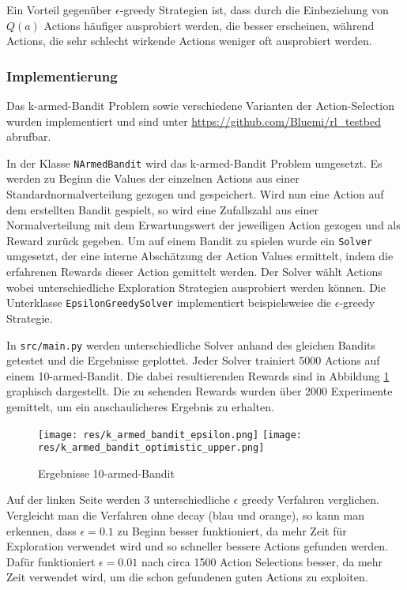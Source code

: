 \documentclass[11pt]{scrartcl}
\begin{document}
Ein Vorteil gegenüber $\epsilon$-greedy Strategien ist, dass durch die Einbeziehung von
$Q(a)$ Actions häufiger ausprobiert werden, die besser erscheinen, während Actions, die
sehr schlecht wirkende Actions weniger oft ausprobiert werden.


\subsubsection{Implementierung}
Das k-armed-Bandit Problem sowie verschiedene Varianten der Action-Selection wurden
implementiert und sind unter \url{https://github.com/Bluemi/rl_testbed} abrufbar.

In der Klasse \lstinline!NArmedBandit! wird das k-armed-Bandit Problem umgesetzt. Es
werden zu Beginn die Values der einzelnen Actions aus einer Standardnormalverteilung
gezogen und gespeichert. Wird nun eine Action auf dem erstellten Bandit gespielt, so wird
eine Zufallszahl aus einer Normalverteilung mit dem Erwartungswert der jeweiligen Action
gezogen und als Reward zurück gegeben.
Um auf einem Bandit zu spielen wurde ein \lstinline!Solver! umgesetzt, der eine interne
Abschät\-zung der Action Values ermittelt, indem die erfahrenen Rewards dieser Action
gemittelt werden. Der Solver wählt Actions wobei unterschiedliche Exploration Strategien
ausprobiert werden können. Die Unterklasse \lstinline!EpsilonGreedySolver! implementiert
beispielsweise die $\epsilon$-greedy Strategie.

In \lstinline!src/main.py! werden unterschiedliche Solver anhand des gleichen Bandits
getestet und die Ergebnisse geplottet. Jeder Solver trainiert 5000 Actions auf einem
10-armed-Bandit. Die dabei resultierenden Rewards sind in Abbildung
\ref{fig:karmed_bandit} graphisch dargestellt. Die zu sehenden Rewards wurden über 2000
Experimente gemittelt, um ein anschaulicheres Ergebnis zu erhalten.

\begin{figure}[htp]
\centering
\texttt{[image: res/k\_armed\_bandit\_epsilon.png]}
\texttt{[image: res/k\_armed\_bandit\_optimistic\_upper.png]}
\caption{Ergebnisse 10-armed-Bandit}
\label{fig:karmed_bandit}
\end{figure}

\noindent
Auf der linken Seite werden 3 unterschiedliche $\epsilon$ greedy Verfahren verglichen.
Vergleicht man die Verfahren ohne decay (blau und orange), so kann man erkennen, dass
$\epsilon = 0.1$ zu Beginn besser funktioniert, da mehr Zeit für Exploration verwendet
wird und so schneller bessere Actions gefunden werden. Dafür funktioniert $\epsilon =
0.01$ nach circa 1500 Action Selections besser, da mehr Zeit verwendet wird, um die schon
gefundenen guten Actions zu exploiten.
\end{document}
